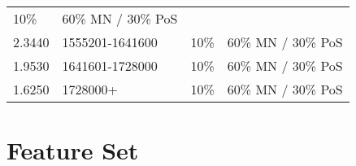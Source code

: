 \documentclass[11pt,a4paperpaper,]{report}
\begin{document}
\begin{longtable}[c]{@{}llll@{}}
\begin{minipage}[t]{0.15\columnwidth}
10\%
\strut\end{minipage} &
\begin{minipage}[t]{0.27\columnwidth}\raggedright\strut
60\% MN / 30\% PoS
\strut\end{minipage}\tabularnewline
\begin{minipage}[t]{0.12\columnwidth}\raggedright\strut
2.3440
\strut\end{minipage} &
\begin{minipage}[t]{0.22\columnwidth}\raggedright\strut
1555201-1641600
\strut\end{minipage} &
\begin{minipage}[t]{0.15\columnwidth}\raggedright\strut
10\%
\strut\end{minipage} &
\begin{minipage}[t]{0.27\columnwidth}\raggedright\strut
60\% MN / 30\% PoS
\strut\end{minipage}\tabularnewline
\begin{minipage}[t]{0.12\columnwidth}\raggedright\strut
1.9530
\strut\end{minipage} &
\begin{minipage}[t]{0.22\columnwidth}\raggedright\strut
1641601-1728000
\strut\end{minipage} &
\begin{minipage}[t]{0.15\columnwidth}\raggedright\strut
10\%
\strut\end{minipage} &
\begin{minipage}[t]{0.27\columnwidth}\raggedright\strut
60\% MN / 30\% PoS
\strut\end{minipage}\tabularnewline
\begin{minipage}[t]{0.12\columnwidth}\raggedright\strut
1.6250
\strut\end{minipage} &
\begin{minipage}[t]{0.22\columnwidth}\raggedright\strut
1728000+
\strut\end{minipage} &
\begin{minipage}[t]{0.15\columnwidth}\raggedright\strut
10\%
\strut\end{minipage} &
\begin{minipage}[t]{0.27\columnwidth}\raggedright\strut
60\% MN / 30\% PoS
\strut\end{minipage}\tabularnewline
\bottomrule
\end{longtable}

\newpage

\chapter{Feature Set}\label{feature-set}
\end{document}
